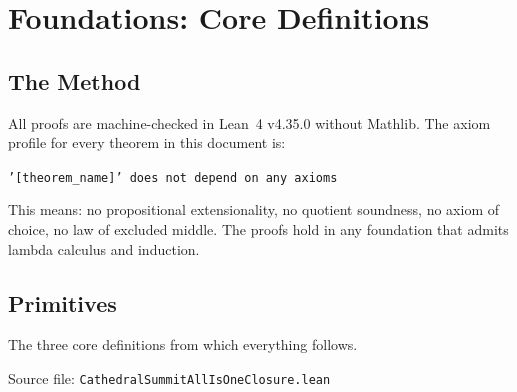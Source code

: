\documentclass[12pt,a4paper]{article}
\begin{document}
\tableofcontents
\newpage

\section{Foundations: Core Definitions}
\label{sec:foundations}

\subsection{The Method}

All proofs are machine-checked in Lean~4 v4.35.0 without Mathlib.
The axiom profile for every theorem in this document is:

\begin{center}
\texttt{'[theorem\_name]' does not depend on any axioms}
\end{center}

This means: no propositional extensionality, no quotient soundness,
no axiom of choice, no law of excluded middle. The proofs hold in
any foundation that admits lambda calculus and induction.

\subsection{Primitives}

The three core definitions from which everything follows.

Source file: \texttt{CathedralSummitAllIsOneClosure.lean}
\end{document}
